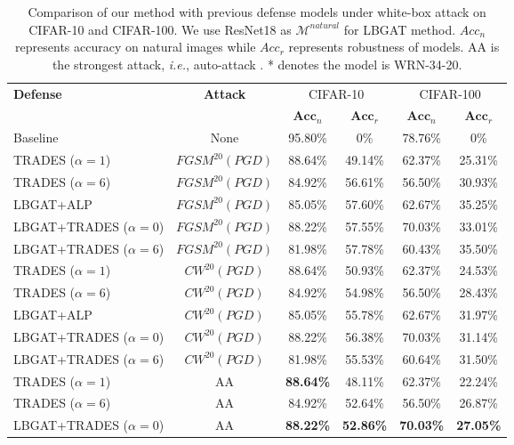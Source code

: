\documentclass[10pt,twocolumn,letterpaper]{article}
\begin{document}
\begin{table*}[t!]
	\centering
	\caption{Comparison of our method with previous defense models under white-box attack on CIFAR-10 and CIFAR-100. We use ResNet18 as $\mathcal{M}^{natural}$ for LBGAT method. $Acc_{n}$ represents accuracy on natural images while $Acc_{r}$ represents robustness of models. AA is the strongest attack, {\it i.e.}, auto-attack \cite{croce2020reliable}. * denotes the model is WRN-34-20.
	}
    {
	\begin{tabular}{l|c|c | c | c |c }
		\hline
		\hline
		\multirow{2}{*}{\textbf{Defense}} & \multirow{2}{*}{\textbf{Attack}} & \multicolumn{2}{c|}{CIFAR-10} & \multicolumn{2}{c}{CIFAR-100} \\
		\cline{3-6}
		& &$\textbf{Acc}_n$ &$\textbf{Acc}_r$ &$\textbf{Acc}_n$ &$\textbf{Acc}_r$ \\
		\hline
		Baseline                      & None  &95.80\% &0\% &78.76\% &0\% \\       
		\hline
		TRADES ($\alpha=1$)           &$FGSM^{20}(PGD)$ &88.64\% & 49.14\% &62.37\% &25.31\% \\
		TRADES ($\alpha=6$)           &$FGSM^{20}(PGD)$ &84.92\% & 56.61\% &56.50\% &30.93\% \\
		LBGAT+ALP                     &$FGSM^{20}(PGD)$ &85.05\% &57.60\% &62.67\% &35.25\% \\
		LBGAT+TRADES ($\alpha=0$)     &$FGSM^{20}(PGD)$ &88.22\% &57.55\% &70.03\% &33.01\%  \\
		LBGAT+TRADES ($\alpha=6$)     &$FGSM^{20}(PGD)$ &81.98\% &57.78\% &60.43\% &35.50\%  \\
		\hline
		TRADES ($\alpha=1$)  &$CW^{20}(PGD)$  &88.64\%  &50.93\% &62.37\% &24.53\% \\
		TRADES ($\alpha=6$)  &$CW^{20}(PGD)$  &84.92\%  &54.98\% &56.50\% &28.43\% \\
		LBGAT+ALP                    &$CW^{20}(PGD)$    &85.05\% &55.78\% &62.67\% &31.97\% \\
		LBGAT+TRADES ($\alpha=0$)    &$CW^{20}(PGD)$    &88.22\% &56.38\% &70.03\% &31.14\% \\
		LBGAT+TRADES ($\alpha=6$)    &$CW^{20}(PGD)$    &81.98\% &55.53\% &60.64\% &31.50\% \\
		\hline
		TRADES ($\alpha=1$)                       &AA &\textbf{88.64\%} &48.11\% &62.37\% &22.24\% \\
		TRADES ($\alpha=6$)                       &AA &84.92\% &52.64\% &56.50\% &26.87\% \\
		LBGAT+TRADES ($\alpha=0$)                 &AA &\textbf{88.22\%} &\textbf{52.86\%} &\textbf{70.03\%} &\textbf{27.05\%} \\

\end{tabular}}
\end{table*}
\end{document}
